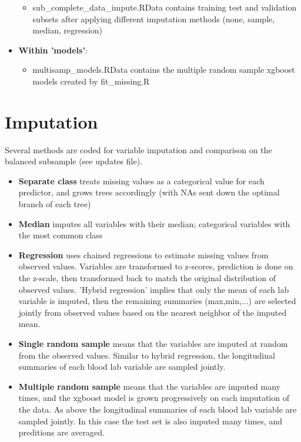 \documentclass[12pt]{article}
\begin{document}
\begin{itemize}
\begin{itemize}
    \item sub\_complete\_data\_impute.RData contains training test and validation subsets after applying different imputation methods (none, sample, median, regression)
  \end{itemize}
  \item {\bf Within 'models'}:
  \begin{itemize}
    \item multisamp\_models.RData contains the multiple random sample xgboost models created by fit\_missing.R
  \end{itemize}
\end{itemize}

\section*{Imputation}

Several methods are coded for variable imputation and comparison on the balanced subsample (see updates file).

\begin{itemize}
  \item {\bf Separate class} treats missing values as a categorical value for each predictor, and grows trees accordingly (with NAs sent down the optimal branch of each tree)
  \item {\bf Median} imputes all variables with their median; categorical variables with the most common class
  \item {\bf Regression} uses chained regressions to estimate missing values from observed values. Variables are transformed to z-scores, prediction is done on the z-scale, then transformed back to match the original distribution of observed values. 'Hybrid regression' implies that only the mean of each lab variable is imputed, then the remaining summaries (max,min,...) are selected jointly from observed values based on the nearest neighbor of the imputed mean.
  \item {\bf Single random sample} means that the variables are imputed at random from the observed values. Similar to hybrid regression, the longitudinal summaries of each blood lab variable are sampled jointly.
  \item {\bf Multiple random sample} means that the variables are imputed many times, and the xgboost model is grown progressively on each imputation of the data. As above the longitudinal summaries of each blood lab variable are sampled jointly. In this case the test set is also imputed many times, and preditions are averaged.
\end{itemize}
\end{document}
